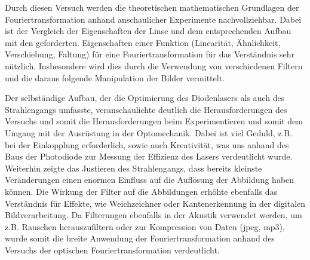 


Durch diesen Versuch werden die theoretischen mathematischen Grundlagen der Fouriertransformation anhand anschaulicher Experimente nachvollziehbar. Dabei ist der Vergleich der Eigenschaften der Linse und dem entsprechenden Aufbau mit den geforderten. Eigenschaften einer Funktion (Linearität, Ähnlichkeit, Verschiebung, Faltung) für eine Fouriertransformation für das Verständnis sehr nützlich. Insbesondere wird dies durch die Verwendung von verschiedenen Filtern und die daraus folgende Manipulation der Bilder vermittelt. 

Der selbständige Aufbau, der die Optimierung des Diodenlasers als auch des Strahlengangs umfasste, veranschaulichte deutlich die Herausforderungen des Versuchs und somit die Herausforderungen beim Experimentieren und somit dem Umgang mit der Ausrüstung in der Optomechanik. Dabei ist viel Geduld, z.B. bei der Einkopplung erforderlich, sowie auch Kreativität, was uns anhand des Baus der Photodiode zur Messung der Effizienz des Lasers verdeutlicht wurde. Weiterhin zeigte das Justieren des Strahlengangs, dass bereits kleinste Veränderungen einen enormen Einfluss auf die Auflösung der Abbildung haben können.
Die Wirkung der Filter auf die Abbildungen erhöhte ebenfalls das Verständnis für Effekte, wie Weichzeichner oder Kantenerkennung in der digitalen Bildverarbeitung. Da Filterungen ebenfalls in der Akustik verwendet werden, um z.B. Rauschen herauszufiltern oder zur Kompression von Daten (jpeg, mp3), wurde somit die breite Anwendung der Fouriertransformation anhand des Versuchs der optischen Fouriertransformation verdeutlicht.